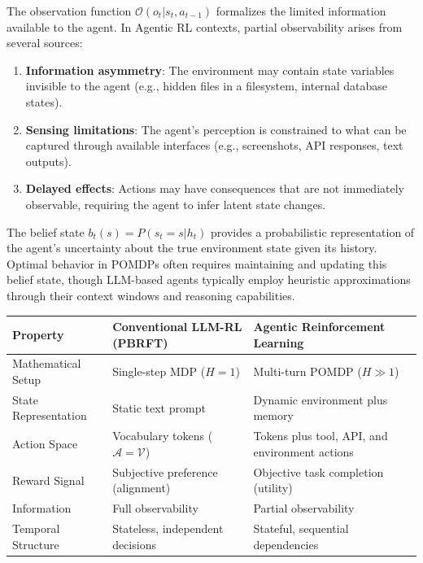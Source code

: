 The observation function $\mathcal{O}(o_t | s_t, a_{t-1})$ formalizes the limited information available to the agent. In Agentic RL contexts, partial observability arises from several sources:

\begin{enumerate}
    \item \textbf{Information asymmetry}: The environment may contain state variables invisible to the agent (e.g., hidden files in a filesystem, internal database states).

    \item \textbf{Sensing limitations}: The agent's perception is constrained to what can be captured through available interfaces (e.g., screenshots, API responses, text outputs).

    \item \textbf{Delayed effects}: Actions may have consequences that are not immediately observable, requiring the agent to infer latent state changes.

\end{enumerate}
The belief state $b_t(s) = P(s_t = s | h_t)$ provides a probabilistic representation of the agent's uncertainty about the true environment state given its history. Optimal behavior in POMDPs often requires maintaining and updating this belief state, though LLM-based agents typically employ heuristic approximations through their context windows and reasoning capabilities.

\begin{table}[tbp]
\centering
\footnotesize
\begin{tabularx}{\textwidth}{YYY}
\toprule
\textbf{Property} & \textbf{Conventional LLM-RL (PBRFT)} & \textbf{Agentic Reinforcement Learning} \\
\midrule
Mathematical Setup & Single-step MDP ($H = 1$) & Multi-turn POMDP ($H \gg 1$) \\
State Representation & Static text prompt & Dynamic environment plus memory \\
Action Space & Vocabulary tokens ($\mathcal{A} = \mathcal{V}$) & Tokens plus tool, API, and environment actions \\
Reward Signal & Subjective preference (alignment) & Objective task completion (utility) \\
Information & Full observability & Partial observability \\
Temporal Structure & Stateless, independent decisions & Stateful, sequential dependencies \\
\bottomrule
\end{tabularx}
\end{table}

